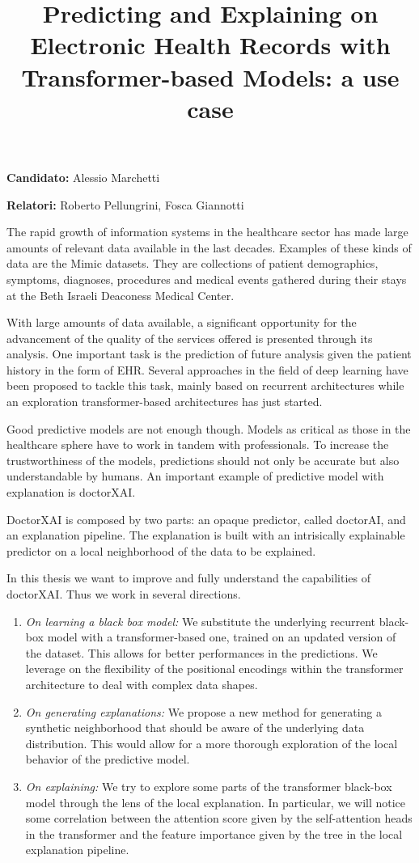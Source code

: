 \documentclass[]{marticle}
\title{\vspace{-2cm}\textbf{\huge Predicting and Explaining on Electronic Health Records  with Transformer-based Models: a use case}}
\date{}
\author{}
\begin{document}
\maketitle


\textbf{Candidato:} Alessio Marchetti

\textbf{Relatori:} Roberto Pellungrini, Fosca Giannotti
\vspace{0.5cm}

The rapid growth of information systems in the healthcare sector has made large amounts of relevant data
available in the last decades. Examples of these kinds of data are the Mimic datasets. They are
collections of patient demographics, symptoms, diagnoses, procedures and medical events gathered
during their stays at the Beth Israeli Deaconess Medical Center.

With large amounts of data available, a significant opportunity for the advancement of the quality
of the services offered is presented through its analysis. One important task is the prediction of
future analysis given the patient history in the form of EHR. Several approaches in the field of
deep learning have been proposed to tackle this task, mainly based on recurrent architectures while
an exploration transformer-based architectures has just started.

Good predictive models are not enough though. Models as critical as those in the healthcare sphere
have to work in tandem with professionals. To increase the trustworthiness of the models,
predictions should not only be accurate but also understandable by humans. An important example of
predictive model with explanation is doctorXAI. 

DoctorXAI is composed by two parts: an opaque predictor, called doctorAI, and an explanation
pipeline. The explanation is built with an intrisically explainable predictor on a local
neighborhood of the data to be explained.

In this thesis we want to improve and fully understand the capabilities of doctorXAI. Thus we work
in several directions.
\begin{enumerate}
\item \emph{On learning a black box model:} We substitute the underlying recurrent black-box model
with a transformer-based one, trained on an updated version of the dataset. This allows for better
performances in the predictions. We leverage on the flexibility of the positional encodings within
the transformer architecture to deal with complex data shapes.

\item \emph{On generating explanations:}  We propose a new method for generating a synthetic
neighborhood that should be aware of the underlying data distribution. This would allow for a more
thorough exploration of the local behavior of the predictive model.

\item \emph{On explaining:} We try to explore some parts of the transformer black-box model
through the lens of the local explanation. In particular, we will notice some correlation between the
attention score given by the self-attention heads in the transformer and the feature importance
given by the tree in the local explanation pipeline.
\end{enumerate}
\end{document}
